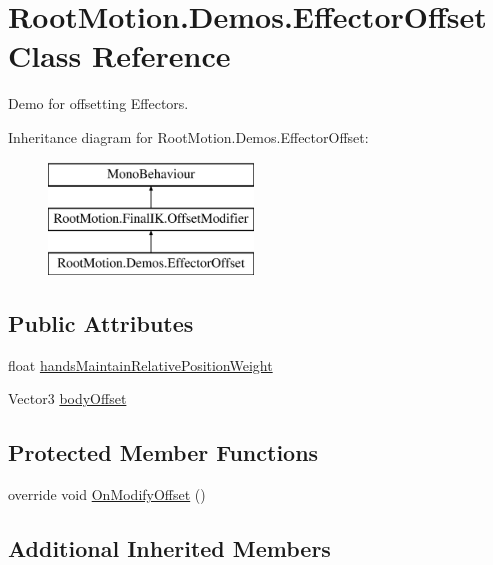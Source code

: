 \hypertarget{class_root_motion_1_1_demos_1_1_effector_offset}{}\section{Root\+Motion.\+Demos.\+Effector\+Offset Class Reference}
\label{class_root_motion_1_1_demos_1_1_effector_offset}


Demo for offsetting Effectors.  


Inheritance diagram for Root\+Motion.\+Demos.\+Effector\+Offset\+:\begin{figure}[H]
\begin{center}
\leavevmode
\includegraphics[height=3.000000cm]{class_root_motion_1_1_demos_1_1_effector_offset}
\end{center}
\end{figure}
\subsection*{Public Attributes}
\begin{DoxyCompactItemize}
\item 
float \mbox{\hyperlink{class_root_motion_1_1_demos_1_1_effector_offset_afce73939f42499be4f5944312822d560}{hands\+Maintain\+Relative\+Position\+Weight}}
\item 
Vector3 \mbox{\hyperlink{class_root_motion_1_1_demos_1_1_effector_offset_ad24b9031a8324ff47da1750b3be3e9e6}{body\+Offset}}
\end{DoxyCompactItemize}
\subsection*{Protected Member Functions}
\begin{DoxyCompactItemize}
\item 
override void \mbox{\hyperlink{class_root_motion_1_1_demos_1_1_effector_offset_afa21e7814f61b1bb693cf27a076eab4c}{On\+Modify\+Offset}} ()
\end{DoxyCompactItemize}
\subsection*{Additional Inherited Members}


